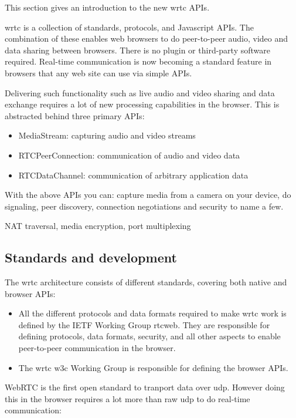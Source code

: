 
This section gives an introduction to the new \gls{wrtc} APIs.

\gls{wrtc} is a collection of standards, protocols, and Javascript APIs. The combination of these enables web browsers to do peer-to-peer audio, video and data sharing between browsers. There is no plugin or third-party software required. Real-time communication is now becoming a standard feature in browsers that any web site can use via simple APIs.

Delivering such functionality such as live audio and video sharing and data exchange requires a lot of new processing capabilities in the browser. This is abstracted behind three primary APIs:

\begin{itemize}
\item MediaStream: capturing audio and video streams
\item RTCPeerConnection: communication of audio and video data
\item RTCDataChannel: communication of arbitrary application data
\end{itemize}

With the above APIs you can: capture media from a camera on your device, do signaling, peer discovery, connection negotiations and security to name a few.

NAT traversal, media encryption, port multiplexing

\subsection{Standards and development}
The \gls{wrtc} architecture consists of different standards, covering both native and browser APIs:

\begin{itemize}
\item All the different protocols and data formats required to make \gls{wrtc} work is defined by the IETF Working Group \gls{rtcweb}. They are responsible for defining protocols, data formats, security, and all other aspects to enable peer-to-peer communication in the browser.
\item The \gls{wrtc} \gls{w3c} Working Group is responsible for defining the browser APIs.
\end{itemize}

WebRTC is the first open standard to tranport data over \gls{udp}. However doing this in the browser requires a lot more than raw \gls{udp} to do real-time communication:

